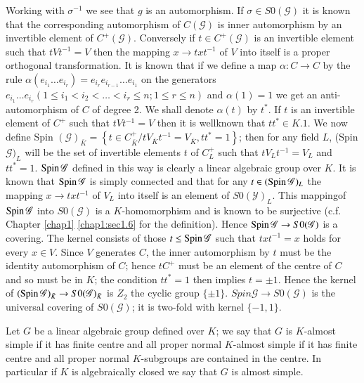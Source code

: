 \noindent
Working with $\sigma^{-1}$ we see that $g$ is an automorphism. If
$\sigma \in S0 (\mathscr{G})$ it is known that the corresponding
automorphism of $C (\mathscr{G})$ is inner automorphism by an
invertible element of $C^+ (\mathscr{G})$. Conversely if  $ t \in C^+
(\mathscr{G})$ is an invertible element such that $tVt^{-1} = V$ then
the mapping $x \rightarrow txt^{-1}$ of $V$ into itself is a proper
orthogonal transformation. It is known that if we define a map
$\alpha : C \rightarrow C$ by the rule $ \alpha(e_{i_{1}} \ldots
e_{i_{r}}) = e_{i_{r}} e_{i_{r-1}} \ldots e_{i_{1}}$  on the
generators  $e_{i_{1}} \ldots e_{i_{r}} ( 1 \leq i_1 < i_2 < \ldots <
i_r \leq n; 1 \leq r \leq n)$ and $\alpha(1) =1$ we get an anti-
automorphism of $C$ of degree 2. We shall denote $\alpha (t)$ by
$t^*$. If $t$ is an invertible element of $C^+$ such that $tVt^{-1} =
V$ then it is wellknown that $tt^* \in K.1$. We now define  Spin
$(\mathscr{G})_{\bar{K}} =  \left\{t \in C^+_{\bar{K}} / tV_{\bar{K}}t^{-1}
= V_{\bar{K}},tt^* = 1 \right\}$; then for any field  $L$, (Spin
$\mathscr{G})_{L}$ will be the set of  invertible elements  $t$ of
$C^{+}_{L}$ such that  $tV_{L}t^{-1} = V_{L}$ and $tt^* = 1$. $\operatorname{Spin}
\mathscr{G}$ defined in this way is clearly a linear algebraic group
over $K$. It is known that  $\operatorname{Spin} \mathscr{G}$ is simply connected
and that for any $t \in (\operatorname{Spin} \mathscr{G})_{L}$ the mapping  $ x
\rightarrow txt^{-1}$ of $V_{L}$ into itself  is an element of $S0
(\mathscr{Y})_{L}$. This mapping\pageoriginale of  $\operatorname{Spin} \mathscr{G}$
into $S0 (\mathscr{G})$ is a $K$-homomorphism and is known to be
surjective (c.f. Chapter \ref{chap1} \ref{chap1:sec1.6}  for the
definition). Hence $\operatorname{Spin} 
\mathscr{G} \rightarrow S0(\mathscr{G})$ is a covering. The  kernel
consists of those $t \leq 
\operatorname{Spin} \mathscr{G}$ such that $txt^{-1} =x$ holds for every $x \in
V$. Since $V$ generates $C$, the inner automorphism by $t$ must be
the identity automorphism of $C$; hence $t C^+$ must be an element of
the centre of $C$ and so must be in $K$; the condition  $tt^* = 1$
then implies $t = \pm 1$. Hence the kernel of $(\operatorname{Spin}
\mathscr{G})_{\bar{K}} \rightarrow S0 (\mathscr{G})_{\bar{K}}$ is
$Z_2$ the cyclic  group $\{\pm 1\}$. $ Spin \mathscr{G} \rightarrow S0
(\mathscr{G})$ is the universal covering of  $S0 (\mathscr{G})$; it is
two-fold with kernel $\{-1,1\}$. 

\begin{defi*}
Let  $G$ be a linear algebraic group defined over $K$; we say that $G$
is $K$-almost simple if it has finite centre and all proper normal
$K$-almost simple if it has finite centre and all proper normal
$K$-subgroups are contained in the centre. In particular if $K$ is
algebraically closed we say that $G$ is almost simple.  
\end{defi*}

